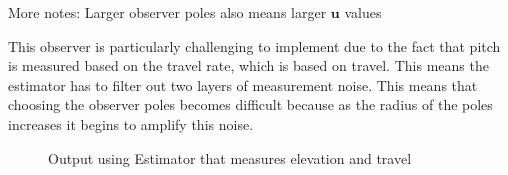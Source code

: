 More notes: Larger observer poles also means larger $\bm{u}$ values

This observer is particularly challenging to implement due to the fact that pitch is measured based on the travel rate, which is based on travel. This means the estimator has to filter out two layers of measurement noise. This means that choosing the observer poles becomes difficult because as the radius of the poles increases it begins to amplify this noise.

\begin{figure}[h]
\caption{Output using Estimator that measures elevation and travel}
\label{fig:Estimator4_3}
\end{figure}


